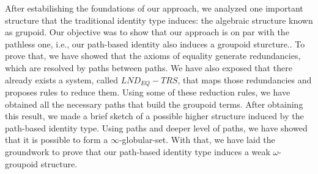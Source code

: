 \documentclass{entcs} \usepackage{entcsmacro}
\begin{document}
After estabilishing the foundations of our approach, we analyzed one important structure that the traditional identity type induces: the algebraic structure known as grupoid. Our objective was to show that our approach is on par with the pathless one, i.e., our path-based identity also induces a groupoid sturcture.. To prove that, we have showed that the axioms of equality generate redundancies, which are resolved by paths between paths. We have also exposed that there already exists a system, called $LND_{EQ}-TRS$, that maps those redundancies and proposes rules to reduce them. Using some of these reduction rules, we have obtained all the necessary paths that build the groupoid terms. After obtaining this result, we made a brief sketch of a possible higher structure induced by the path-based identity type. Using paths and deeper level of paths, we have showed that it is possible to form a $\infty$-globular-set. With that, we have laid the groundwork to prove that our path-based identity type induces a weak $\omega$-groupoid structure.



\end{document}
